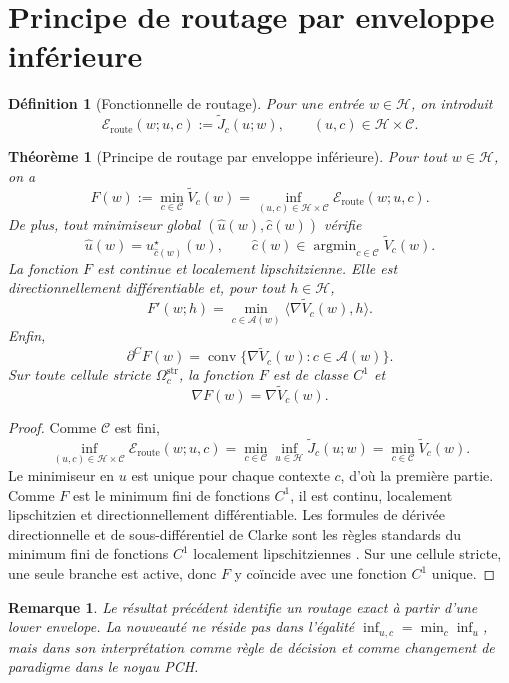 \documentclass[11pt,a4paper]{article}
\newtheorem{definition}{Définition}[section]
\newtheorem{theorem}{Théorème}[section]
\newtheorem{remark}{Remarque}[section]
\DeclareMathOperator{\argmin}{argmin}
\DeclareMathOperator{\conv}{conv}
\newcommand{\Hh}{\mathcal H}
\newcommand{\Ccal}{\mathcal C}
\newcommand{\Acal}{\mathcal A}
\begin{document}
\section{Principe de routage par enveloppe inférieure}

\begin{definition}[Fonctionnelle de routage]
Pour une entrée \(w\in\Hh\), on introduit
\[
\mathcal E_{\mathrm{route}}(w;u,c):=\widetilde J_c(u;w),
\qquad (u,c)\in\Hh\times\Ccal.
\]
\end{definition}

\begin{theorem}[Principe de routage par enveloppe inférieure]
Pour tout \(w\in\Hh\), on a
\[
F(w):=\min_{c\in\Ccal}\widetilde V_c(w)
=
\inf_{(u,c)\in\Hh\times\Ccal}\mathcal E_{\mathrm{route}}(w;u,c).
\]
De plus, tout minimiseur global \((\hat u(w),\hat c(w))\) vérifie
\[
\hat u(w)=u_{\hat c(w)}^\star(w),
\qquad
\hat c(w)\in\argmin_{c\in\Ccal}\widetilde V_c(w).
\]
La fonction \(F\) est continue et localement lipschitzienne. Elle est directionnellement différentiable et, pour tout \(h\in\Hh\),
\[
F'(w;h)=\min_{c\in\Acal(w)}\langle \nabla \widetilde V_c(w),h\rangle.
\]
Enfin,
\[
\partial^C F(w)=\conv\{\nabla \widetilde V_c(w): c\in\Acal(w)\}.
\]
Sur toute cellule stricte \(\Omega_c^{\mathrm{str}}\), la fonction \(F\) est de classe \(C^1\) et
\[
\nabla F(w)=\nabla \widetilde V_c(w).
\]
\end{theorem}

\begin{proof}
Comme \(\Ccal\) est fini,
\[
\inf_{(u,c)\in\Hh\times\Ccal}\mathcal E_{\mathrm{route}}(w;u,c)
=
\min_{c\in\Ccal}\inf_{u\in\Hh}\widetilde J_c(u;w)
=
\min_{c\in\Ccal}\widetilde V_c(w).
\]
Le minimiseur en \(u\) est unique pour chaque contexte \(c\), d'où la première partie. Comme \(F\) est le minimum fini de fonctions \(C^1\), il est continu, localement lipschitzien et directionnellement différentiable. Les formules de dérivée directionnelle et de sous-différentiel de Clarke sont les règles standards du minimum fini de fonctions \(C^1\) localement lipschitziennes \cite{Clarke1983}. Sur une cellule stricte, une seule branche est active, donc \(F\) y coïncide avec une fonction \(C^1\) unique.
\end{proof}

\begin{remark}
Le résultat précédent identifie un routage exact à partir d'une lower envelope. La nouveauté ne réside pas dans l'égalité \(\inf_{u,c}=\min_c\inf_u\), mais dans son interprétation comme règle de décision et comme changement de paradigme dans le noyau PCH.
\end{remark}
\end{document}
